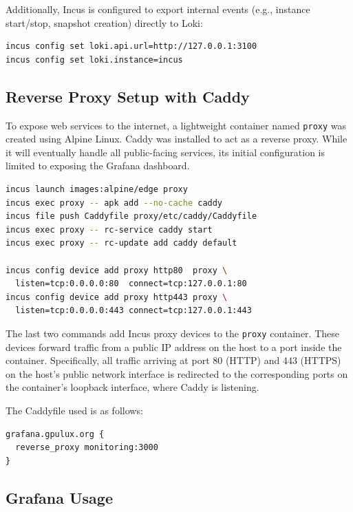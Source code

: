 Additionally, Incus is configured to export internal events (e.g., instance start/stop, snapshot creation) directly to Loki\cite{incus-loki-api}:

\begin{lstlisting}[language=bash]
incus config set loki.api.url=http://127.0.0.1:3100
incus config set loki.instance=incus
\end{lstlisting}

\subsection*{Reverse Proxy Setup with Caddy}

To expose web services to the internet, a lightweight container named \texttt{proxy} was created using Alpine Linux. Caddy was installed to act as a reverse proxy. While it will eventually handle all public-facing services, its initial configuration is limited to exposing the Grafana dashboard.

\begin{lstlisting}[language=bash,caption={Commands to set up the Caddy reverse proxy container.}]
incus launch images:alpine/edge proxy
incus exec proxy -- apk add --no-cache caddy
incus file push Caddyfile proxy/etc/caddy/Caddyfile
incus exec proxy -- rc-service caddy start
incus exec proxy -- rc-update add caddy default

incus config device add proxy http80  proxy \
  listen=tcp:0.0.0.0:80  connect=tcp:127.0.0.1:80
incus config device add proxy http443 proxy \
  listen=tcp:0.0.0.0:443 connect=tcp:127.0.0.1:443
\end{lstlisting}

The last two commands add Incus proxy devices\cite{incus-proxy-device} to the \texttt{proxy} container. These devices forward traffic from a public IP address on the host to a port inside the container. Specifically, all traffic arriving at port 80 (HTTP) and 443 (HTTPS) on the host's public network interface is redirected to the corresponding ports on the container's loopback interface, where Caddy is listening.

The Caddyfile used is as follows:

\begin{lstlisting}[caption={Caddyfile configuration to reverse proxy Grafana.}]
grafana.gpulux.org {
  reverse_proxy monitoring:3000
}
\end{lstlisting}

\subsection*{Grafana Usage}

